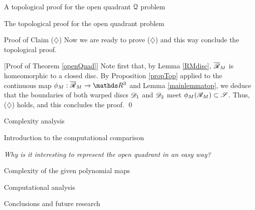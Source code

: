 \documentclass[11pt, a4paper, english, twoside, notitlepage, openright]{report}
\begin{document}
\begin{chapter}{A topological proof for the open quadrant $\mathcal{Q}$ problem}
\begin{section}{The topological proof for the open quadrant problem}
\begin{subsection}{Proof of Claim ($\diamondsuit$)}
Now we are ready to prove ($\diamondsuit$) and this way conclude the topological proof.

\vspace{2mm}		

[Proof of Theorem \ref{openQuad}] Note first that, by Lemma \ref{RMdisc}, $\overline{\mathscr{R}}_M$ is homeomorphic to a closed disc. By Proposition \ref{propTop} applied to the continuous map $\phi_M:\overline{\Rr}_M\to\R^3$ and Lemma \ref{mainlemmatop}, we deduce that the boundaries of both warped discs $\mathscr{D}_1$ and $\mathscr{D}_2$ meet $\phi_M({\mathscr{R}}_M)\subset\mathscr{S}$. Thus, ($\diamondsuit$) holds, and this concludes the proof.
\qed

\end{subsection}
\end{section}
\end{chapter}

\begin{chapter}{Complexity analysis}\label{compChapter}

\begin{section}{Introduction to the computational comparison}\label{5sect1}

\emph{Why is it interesting to represent the open quadrant in an easy way?}
	
\end{section}

\begin{section}{Complexity of the given polynomial maps}\label{5sect2}

\end{section}

\begin{section}{Computational analysis}\label{5sect3}

\end{section}

\begin{section}{Conclusions and future research}\label{5sect4}

\end{section}

\end{chapter}
\end{document}
